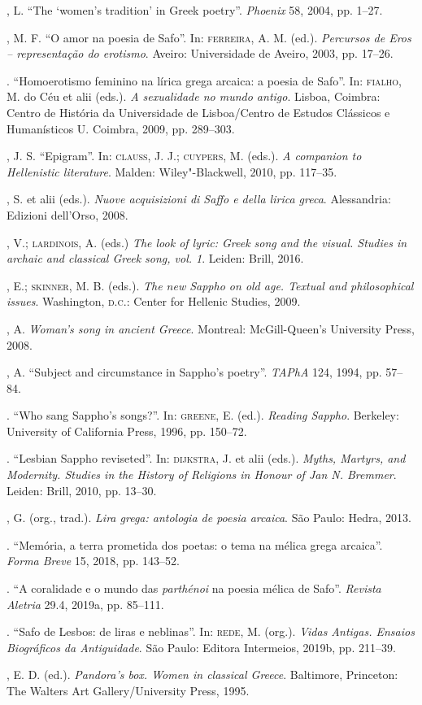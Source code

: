 \begin{bibliohedra}
, L. “The ‘women’s tradition’ in Greek poetry”. \textit{Phoenix} 58, 2004, pp. 1--27.

, M. F. “O amor na poesia de Safo”. In: \textsc{ferreira}, A. M. (ed.). \textit{Percursos de Eros -- representação do erotismo}. Aveiro: Universidade de Aveiro, 2003, pp. 17--26.

\titidem. “Homoerotismo feminino na lírica grega arcaica: a poesia de Safo”. In: \textsc{fialho}, M. do Céu et alii (eds.). \textit{A sexualidade no mundo antigo}. Lisboa, Coimbra: Centro de História da Universidade de Lisboa/Centro de Estudos Clássicos e Humanísticos U. Coimbra, 2009, pp. 289--303. 

, J. S. “Epigram”. In: \textsc{clauss}, J. J.; \textsc{cuypers}, M. (eds.). \textit{A companion to Hellenistic literature}. Malden: Wiley"-Blackwell, 2010, pp. 117--35. 

, S. et alii (eds.). \textit{Nuove acquisizioni di Saffo e della lirica greca}. Alessandria: Edizioni dell'Orso, 2008.

, V.; \textsc{lardinois}, A. (eds.) \textit{The look of lyric: Greek song and the visual. Studies in archaic and classical Greek song, vol. 1}. Leiden: Brill, 2016.

, E.; \textsc{skinner}, M. B. (eds.). \textit{The new Sappho on old age. Textual and philosophical issues}. Washington, \textsc{d.c.}: Center for Hellenic Studies, 2009.

, A. \textit{Woman’s song in ancient Greece}. Montreal: McGill-Queen’s University Press, 2008. 

, A. “Subject and circumstance in Sappho’s poetry”. \textit{TAPhA} 124, 1994, pp. 57--84.

\titidem. “Who sang Sappho’s songs?”. In: \textsc{greene}, E. (ed.). \textit{Reading Sappho}. Berkeley: University of California Press, 1996, pp. 150--72.

\titidem. ``Lesbian Sappho reviseted''. In: \textsc{dijkstra}, J. et alii (eds.). \textit{Myths, Martyrs, and Modernity. Studies in the History of Religions in Honour of Jan N. Bremmer}. Leiden: Brill, 2010, pp. 13--30.

, G. (org., trad.). \textit{Lira grega: antologia de poesia arcaica}. São Paulo: Hedra, 2013.

\titidem. “Memória, a terra prometida dos poetas: o tema na mélica grega arcaica”. \textit{Forma Breve} 15, 2018, pp. 143--52. 

\titidem. “A coralidade e o mundo das \textit{parthénoi} na poesia mélica de Safo”. \textit{Revista Aletria} 29.4, 2019a, pp. 85--111. 

\titidem. “Safo de Lesbos: de liras e neblinas”. In: \textsc{rede}, M. (org.). \textit{Vidas Antigas. Ensaios Biográficos da Antiguidade}. São Paulo: Editora Intermeios, 2019b, pp. 211--39.

, E. D. (ed.). \textit{Pandora’s box. Women in classical Greece}. Baltimore, Princeton: The Walters Art Gallery/University Press, 1995.

\end{bibliohedra}




